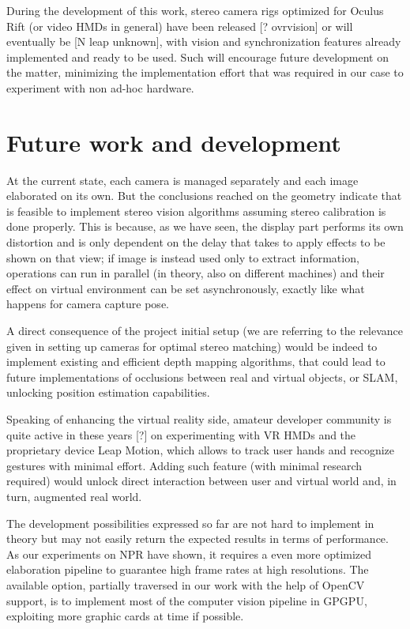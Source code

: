 During the development of this work, stereo camera rigs optimized for Oculus Rift (or video HMDs in general) have been released [? ovrvision] or will eventually be [N leap unknown], with vision and synchronization features already implemented and ready to be used. Such will encourage future development on the matter, minimizing the implementation effort that was required in our case to experiment with non ad-hoc hardware.

\section{Future work and development}
At the current state, each camera is managed separately and each image elaborated on its own. But the conclusions reached on the geometry indicate that is feasible to implement stereo vision algorithms assuming stereo calibration is done properly. This is because, as we have seen, the display part performs its own distortion and is only dependent on the delay that takes to apply effects to be shown on that view; if image is instead used only to extract information, operations can run in parallel (in theory, also on different machines) and their effect on virtual environment can be set asynchronously, exactly like what happens for camera capture pose.

A direct consequence of the project initial setup (we are referring to the relevance given in setting up cameras for optimal stereo matching) would be indeed to implement existing and efficient depth mapping algorithms, that could lead to future implementations of occlusions between real and virtual objects, or SLAM, unlocking position estimation capabilities.

Speaking of enhancing the virtual reality side, amateur developer community is quite active in these years [?] on experimenting with VR HMDs and the proprietary device Leap Motion, which allows to track user hands and recognize gestures with minimal effort. Adding such feature (with minimal research required) would unlock direct interaction between user and virtual world and, in turn, augmented real world.

The development possibilities expressed so far are not hard to implement in theory but may not easily return the expected results in terms of performance. As our experiments on NPR have shown, it requires a even more optimized elaboration pipeline to guarantee high frame rates at high resolutions. The available option, partially traversed in our work with the help of OpenCV support, is to implement most of the computer vision pipeline in GPGPU, exploiting more graphic cards at time if possible.

